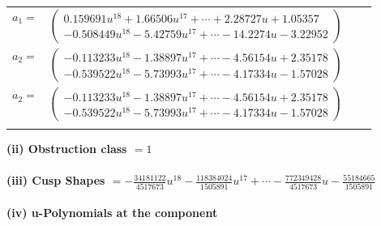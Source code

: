 \documentclass[1p]{elsarticle_modified}
\theoremstyle{definition}
\begin{document}
\begin{tabular}{m{7pt} m{180pt} m{7pt} m{180pt} }
\flushright $a_{1}=$&$\begin{pmatrix}0.159691 u^{18}+1.66506 u^{17}+\cdots+2.28727 u+1.05357\\-0.508449 u^{18}-5.42759 u^{17}+\cdots-14.2274 u-3.22952\end{pmatrix}$ \\
\flushright $a_{2}=$&$\begin{pmatrix}-0.113233 u^{18}-1.38897 u^{17}+\cdots-4.56154 u+2.35178\\-0.539522 u^{18}-5.73993 u^{17}+\cdots-4.17334 u-1.57028\end{pmatrix}$\\ \flushright $a_{2}=$&$\begin{pmatrix}-0.113233 u^{18}-1.38897 u^{17}+\cdots-4.56154 u+2.35178\\-0.539522 u^{18}-5.73993 u^{17}+\cdots-4.17334 u-1.57028\end{pmatrix}$\\&\end{tabular}
\flushleft \textbf{(ii) Obstruction class $= 1$}\\~\\
\flushleft \textbf{(iii) Cusp Shapes $= -\frac{34181122}{4517673} u^{18}-\frac{118384024}{1505891} u^{17}+\cdots-\frac{772349428}{4517673} u-\frac{55184665}{1505891}$}\\~\\
\newpage\renewcommand{\arraystretch}{1}
\flushleft \textbf{(iv) u-Polynomials at the component}\newline \\
\end{document}
